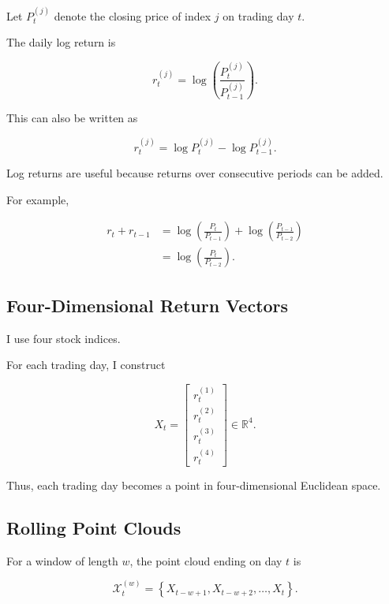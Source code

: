 \documentclass[oneside,english,11pt]{article}
\renewcommand{\boxed}[1]{#1}
\begin{document}
Let $P_t^{(j)}$ denote the closing price of index $j$
on trading day $t$.

The daily log return is

\begin{equation}
\boxed{
r_t^{(j)}
=
\log\left(
\frac{P_t^{(j)}}{P_{t-1}^{(j)}}
\right).
}
\end{equation}

This can also be written as

\begin{equation}
r_t^{(j)}
=
\log P_t^{(j)}
-
\log P_{t-1}^{(j)}.
\end{equation}

Log returns are useful because returns over consecutive
periods can be added.

For example,

\begin{align}
r_t+r_{t-1}
&=
\log\left(\frac{P_t}{P_{t-1}}\right)
+
\log\left(\frac{P_{t-1}}{P_{t-2}}\right)
\\
&=
\log\left(\frac{P_t}{P_{t-2}}\right).
\end{align}

\subsection{Four-Dimensional Return Vectors}

I use four stock indices.

For each trading day, I construct

\begin{equation}
\boxed{
X_t=
\begin{bmatrix}
r_t^{(1)}\\
r_t^{(2)}\\
r_t^{(3)}\\
r_t^{(4)}
\end{bmatrix}
\in\mathbb{R}^4.
}
\end{equation}

Thus, each trading day becomes a point in
four-dimensional Euclidean space.

\subsection{Rolling Point Clouds}

For a window of length $w$, the point cloud ending
on day $t$ is

\begin{equation}
\boxed{
\mathcal{X}_t^{(w)}
=
\left\{
X_{t-w+1},
X_{t-w+2},
\ldots,
X_t
\right\}.
}
\end{equation}
\end{document}
